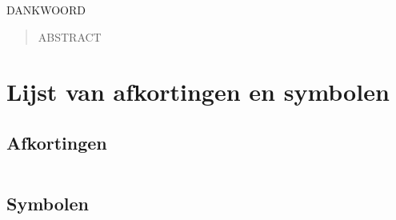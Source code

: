 \documentclass[master=cws,masteroption=mmc]{kulemt}
\begin{document}
\begin{preface}
	DANKWOORD %
\end{preface}

\tableofcontents*

\begin{abstract}
  ABSTRACT %
\end{abstract}

\listoffiguresandtables
\chapter{Lijst van afkortingen en symbolen}
\section*{Afkortingen}


\begin{flushleft}
  \renewcommand{\arraystretch}{1.1}
  \begin{tabularx}{\textwidth}{@{}p{12mm}X@{}}
  \end{tabularx}
\end{flushleft}
\section*{Symbolen}


\begin{flushleft}
  \renewcommand{\arraystretch}{1.1}
  \begin{tabularx}{\textwidth}{@{}p{12mm}X@{}}
  \end{tabularx}
\end{flushleft}
\end{document}
